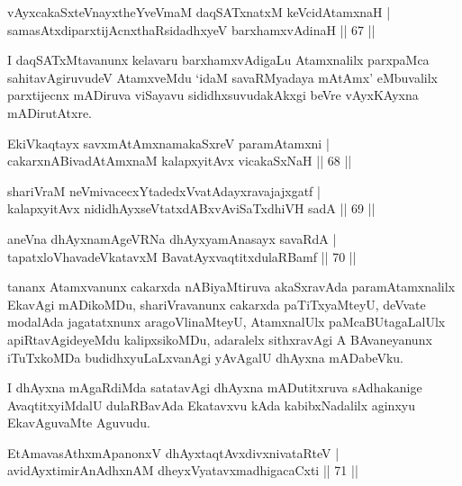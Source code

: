 
\begin{shl}
vAyxcakaSxteV\s nayxtheYveVmaM daqSATxnatxM keVcidAtamxnaH |\\
samasAtxdiparxtijAcnxthaRsidadhxyeV barxhamxvAdinaH \hfill || 67 ||
\end{shl}

\begin{artha}
I daqSATxMtavanunx kelavaru barxhamxvAdigaLu Atamxnalilx parxpaMca sahitavAgiruvudeV AtamxveMdu `idaM savaRMyadaya mAtAmx' eMbuvalilx parxtijecnx mADiruva viSayavu sididhxsuvudakAkxgi beVre vAyxKAyxna mADirutAtxre.
\end{artha}

\begin{shl}
EkiVkaqtayx savxmAtAmxnamakaSxreV paramAtamxni |\\
cakarxnABivadAtAmxnaM kalapxyitAvx vicakaSxNaH \hfill || 68 ||
\end{shl}
\begin{shl}
shariVraM neVmivacecxYtadedxVvatAdayxravajajxgatf |\\
kalapxyitAvx nididhAyxseVtatxdABxvAviSaTxdhiVH sadA \hfill || 69 ||
\end{shl}
\begin{shl}
aneVna dhAyxnamAgeVRNa dhAyxyamAnasayx savaRdA |\\
tapatxloVhavadeVkatavxM BavatAyxvaqtitxdulaRBamf \hfill || 70 ||
\end{shl}

\begin{artha}
tananx Atamxvanunx cakarxda nABiyaMtiruva akaSxravAda paramAtamxnalilx EkavAgi mADikoMDu, shariVravanunx cakarxda paTiTxyaMteyU, deVvate modalAda jagatatxnunx aragoVlinaMteyU, AtamxnalUlx paMcaBUtagaLalUlx apiRtavAgideyeMdu kalipxsikoMDu, adaralelx sithxravAgi A BAvaneyanunx iTuTxkoMDa budidhxyuLaLxvanAgi yAvAgalU dhAyxna mADabeVku.
\end{artha}



\begin{artha}
I dhAyxna mAgaRdiMda satatavAgi dhAyxna mADutitxruva sAdhakanige AvaqtitxyiMdalU dulaRBavAda Ekatavxvu kAda kabibxNadalilx aginxyu EkavAguvaMte Aguvudu.
\end{artha}

\begin{shl}
EtAmavasAthxmApanonxV dhAyxtaqtAvxdivxnivataRteV |\\
avidAyxtimirAnAdhxnAM dheyxVyatavxmadhigacaCxti \hfill || 71 ||
\end{shl}


